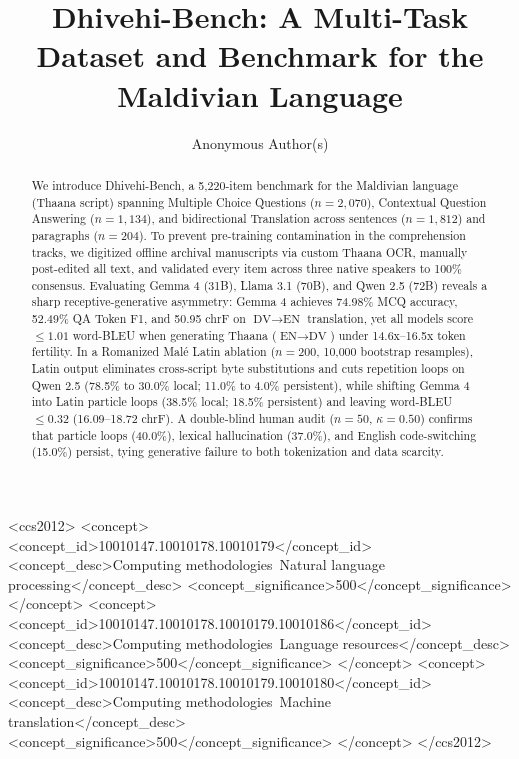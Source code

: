 \documentclass[acmsmall,review,anonymous]{acmart}
\begin{document}
\title{Dhivehi-Bench: A Multi-Task Dataset and Benchmark for the Maldivian Language}

\author{Anonymous Author(s)}

\begin{abstract}
We introduce Dhivehi-Bench, a 5,220-item benchmark for the Maldivian language (Thaana script) spanning Multiple Choice Questions ($n=2,070$), Contextual Question Answering ($n=1,134$), and bidirectional Translation across sentences ($n=1,812$) and paragraphs ($n=204$). To prevent pre-training contamination in the comprehension tracks, we digitized offline archival manuscripts via custom Thaana OCR, manually post-edited all text, and validated every item across three native speakers to 100\% consensus. Evaluating Gemma 4 (31B), Llama 3.1 (70B), and Qwen 2.5 (72B) reveals a sharp receptive-generative asymmetry: Gemma 4 achieves 74.98\% MCQ accuracy, 52.49\% QA Token F1, and 50.95 chrF on $\text{DV}\rightarrow\text{EN}$ translation, yet all models score $\leq 1.01$ word-BLEU when generating Thaana ($\text{EN}\rightarrow\text{DV}$) under 14.6x--16.5x token fertility. In a Romanized Mal\'{e} Latin ablation ($n=200$, 10,000 bootstrap resamples), Latin output eliminates cross-script byte substitutions and cuts repetition loops on Qwen 2.5 (78.5\% to 30.0\% local; 11.0\% to 4.0\% persistent), while shifting Gemma 4 into Latin particle loops (38.5\% local; 18.5\% persistent) and leaving word-BLEU $\leq 0.32$ (16.09--18.72 chrF). A double-blind human audit ($n=50$, $\kappa=0.50$) confirms that particle loops (40.0\%), lexical hallucination (37.0\%), and English code-switching (15.0\%) persist, tying generative failure to both tokenization and data scarcity.
\end{abstract}

\begin{CCSXML}
<ccs2012>
   <concept>
       <concept_id>10010147.10010178.10010179</concept_id>
       <concept_desc>Computing methodologies~Natural language processing</concept_desc>
       <concept_significance>500</concept_significance>
   </concept>
   <concept>
       <concept_id>10010147.10010178.10010179.10010186</concept_id>
       <concept_desc>Computing methodologies~Language resources</concept_desc>
       <concept_significance>500</concept_significance>
   </concept>
   <concept>
       <concept_id>10010147.10010178.10010179.10010180</concept_id>
       <concept_desc>Computing methodologies~Machine translation</concept_desc>
       <concept_significance>500</concept_significance>
   </concept>
</ccs2012>
\end{CCSXML}
\end{document}
